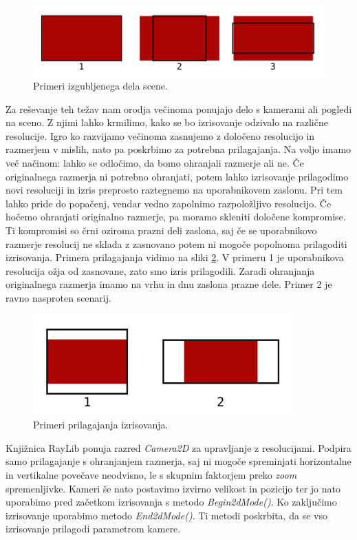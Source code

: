 \documentclass[12pt,a4paper,twoside]{book}
\begin{document}
\begin{figure}[h]
	\centering
	\includegraphics[width=12cm]{rezanjeResolucije}
	\caption{Primeri izgubljenega dela scene.}
	\label{slika:rezanje}
\end{figure}

Za reševanje teh težav nam orodja večinoma ponujajo delo s kamerami ali pogledi na sceno. Z njimi lahko krmilimo, kako se bo izrisovanje odzivalo na različne resolucije. Igro ko razvijamo večinoma zasnujemo z določeno resolucijo in razmerjem v mislih, nato pa poskrbimo za potrebna prilagajanja. Na voljo imamo več načinom: lahko se odločimo, da bomo ohranjali razmerje ali ne. Če originalnega razmerja ni potrebno ohranjati, potem lahko izrisovanje prilagodimo novi resoluciji in izris preprosto raztegnemo na uporabnikovem zaslonu. Pri tem lahko pride do popačenj, vendar vedno zapolnimo razpoložljivo resolucijo. Če hočemo ohranjati originalno razmerje, pa moramo skleniti določene kompromise. Ti kompromisi so črni oziroma prazni deli zaslona, saj če se uporabnikovo razmerje resolucij ne sklada z zasnovano potem ni mogoče popolnoma prilagoditi izrisovanja. Primera prilagajanja vidimo na sliki \ref{slika:prilagajanje}. V primeru 1 je uporabnikova resolucija ožja od zasnovane, zato smo izris prilagodili. Zaradi ohranjanja originalnega razmerja imamo na vrhu in dnu zaslona prazne dele. Primer 2 je ravno nasproten scenarij.

\begin{figure}[h]
	\centering
	\includegraphics[width=10cm]{prilagajanje}
	\caption{Primeri prilagajanja izrisovanja.}
	\label{slika:prilagajanje}
\end{figure}

Knjižnica RayLib ponuja razred \textit{Camera2D} za upravljanje z resolucijami. Podpira samo prilagajanje s ohranjanjem razmerja, saj ni mogoče spreminjati horizontalne in vertikalne povečave neodvisno, le s skupnim faktorjem preko \textit{zoom} spremenljivke. Kameri še nato postavimo izvirno velikost in pozicijo ter jo nato uporabimo pred začetkom izrisovanja s metodo \textit{Begin2dMode()}. Ko zaključimo izrisovanje uporabimo metodo \textit{End2dMode()}. Ti metodi poskrbita, da se vso izrisovanje prilagodi parametrom kamere.
\end{document}
